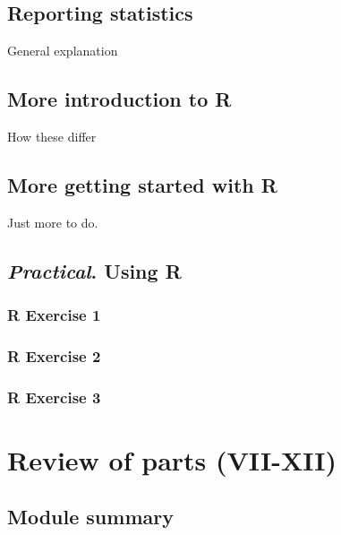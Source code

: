 \documentclass[
]{scrbook}
\begin{document}
\hypertarget{reporting-statistics}{%
\chapter{Reporting statistics}\label{reporting-statistics}}

General explanation

\hypertarget{more-introduction-to-r}{%
\chapter{More introduction to R}\label{more-introduction-to-r}}

How these differ

\hypertarget{more-getting-started-with-r}{%
\chapter{More getting started with R}\label{more-getting-started-with-r}}

Just more to do.

\hypertarget{practical.-using-r-1}{%
\chapter{\texorpdfstring{\emph{Practical}. Using R}{Practical. Using R}}\label{practical.-using-r-1}}

\hypertarget{r-exercise-1-1}{%
\section{R Exercise 1}\label{r-exercise-1-1}}

\hypertarget{r-exercise-2-1}{%
\section{R Exercise 2}\label{r-exercise-2-1}}

\hypertarget{r-exercise-3-1}{%
\section{R Exercise 3}\label{r-exercise-3-1}}

\hypertarget{part-review-of-parts-vii-xii}{%
\part{Review of parts (VII-XII)}\label{part-review-of-parts-vii-xii}}

\hypertarget{Week13}{%
\chapter*{Module summary}\label{Week13}}
\end{document}
